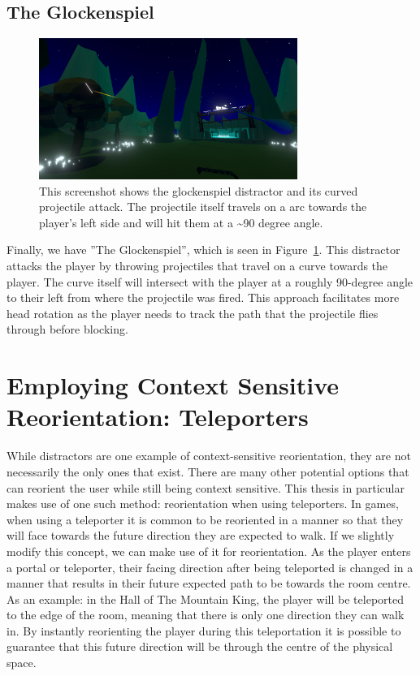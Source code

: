 \subsection{The Glockenspiel}
\begin{figure}[tbph]
    \centering
    \includegraphics[width=0.75\textwidth]{figures/screenshots/glockenspiel.png}
    \caption[The Glockenspiel Distractor]{This screenshot shows the glockenspiel distractor and its curved projectile attack. The projectile itself travels on a arc towards the player's left side and will hit them at a \textasciitilde90 degree angle.}
    \label{fig:glockenspielDistractor}
\end{figure}
Finally, we have ''The Glockenspiel'', which is seen in Figure~\ref{fig:glockenspielDistractor}. This distractor attacks the player by throwing projectiles that travel on a curve towards the player. The curve itself will intersect with the player at a roughly 90-degree angle to their left from where the projectile was fired. This approach facilitates more head rotation as the player needs to track the path that the projectile flies through before blocking. 

\section{Employing Context Sensitive Reorientation: Teleporters}
While distractors are one example of context-sensitive reorientation, they are not necessarily the only ones that exist. There are many other potential options that can reorient the user while still being context sensitive. This thesis in particular makes use of one such method: reorientation when using teleporters. In games, when using a teleporter it is common to be reoriented in a manner so that they will face towards the future direction they are expected to walk. If we slightly modify this concept, we can make use of it for reorientation. As the player enters a portal or teleporter, their facing direction after being teleported is changed in a manner that results in their future expected path to be towards the room centre. As an example: in the Hall of The Mountain King, the player will be teleported to the edge of the room, meaning that there is only one direction they can walk in. By instantly reorienting the player during this teleportation it is possible to guarantee that this future direction will be through the centre of the physical space. 

